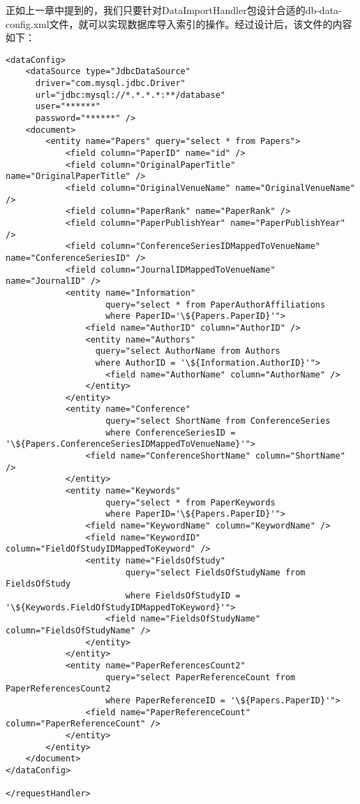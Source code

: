 正如上一章中提到的，我们只要针对DataImportHandler包设计合适的db-data-config.xml文件，就可以实现数据库导入索引的操作。经过设计后，该文件的内容如下：
\begin{lstlisting}[caption={从数据库中导入索引的db-data-config.xml}, label=dbtoindex, escapeinside="", numbers=none]
<dataConfig>
    <dataSource type="JdbcDataSource"
      driver="com.mysql.jdbc.Driver"
      url="jdbc:mysql://*.*.*.*:**/database"
      user="******"
      password="******" />
    <document>
        <entity name="Papers" query="select * from Papers">
            <field column="PaperID" name="id" />
            <field column="OriginalPaperTitle" name="OriginalPaperTitle" />
            <field column="OriginalVenueName" name="OriginalVenueName" />
            <field column="PaperRank" name="PaperRank" />
            <field column="PaperPublishYear" name="PaperPublishYear" />
            <field column="ConferenceSeriesIDMappedToVenueName" name="ConferenceSeriesID" />
            <field column="JournalIDMappedToVenueName" name="JournalID" />
            <entity name="Information"
                    query="select * from PaperAuthorAffiliations
                    where PaperID='\${Papers.PaperID}'">
                <field name="AuthorID" column="AuthorID" />
                <entity name="Authors"
                  query="select AuthorName from Authors
                  where AuthorID = '\${Information.AuthorID}'">
                    <field name="AuthorName" column="AuthorName" />
                </entity>
            </entity>
            <entity name="Conference"
                    query="select ShortName from ConferenceSeries
                    where ConferenceSeriesID = '\${Papers.ConferenceSeriesIDMappedToVenueName}'">
                <field name="ConferenceShortName" column="ShortName" />
            </entity>
            <entity name="Keywords"
                    query="select * from PaperKeywords
                    where PaperID='\${Papers.PaperID}'">
                <field name="KeywordName" column="KeywordName" />
                <field name="KeywordID" column="FieldOfStudyIDMappedToKeyword" />
                <entity name="FieldsOfStudy"
                        query="select FieldsOfStudyName from FieldsOfStudy
                        where FieldsOfStudyID = '\${Keywords.FieldOfStudyIDMappedToKeyword}'">
                    <field name="FieldsOfStudyName" column="FieldsOfStudyName" />
                </entity>
            </entity>
            <entity name="PaperReferencesCount2"
                    query="select PaperReferenceCount from PaperReferencesCount2
                    where PaperReferenceID = '\${Papers.PaperID}'">
                <field name="PaperReferenceCount" column="PaperReferenceCount" />
            </entity>
        </entity>
    </document>
</dataConfig>

</requestHandler>
\end{lstlisting}

